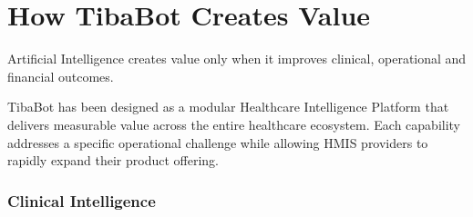 
\chapter*{How TibaBot Creates Value}

Artificial Intelligence creates value only when it improves clinical, operational and financial outcomes.

TibaBot has been designed as a modular Healthcare Intelligence Platform that delivers measurable value across the entire healthcare ecosystem. Each capability addresses a specific operational challenge while allowing HMIS providers to rapidly expand their product offering.

\vspace{8mm}


\subsection{Clinical Intelligence}

